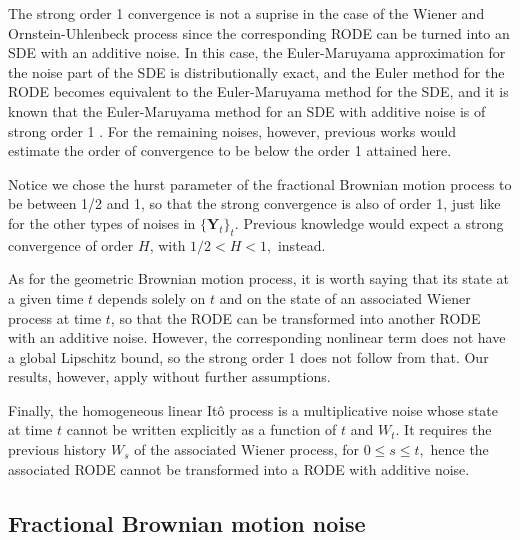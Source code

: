 \documentclass[reqno,12pt]{amsart}
\theoremstyle{plain} %
\theoremstyle{definition} %
\begin{document}
The strong order 1 convergence is not a suprise in the case of the Wiener and Ornstein-Uhlenbeck process since the corresponding RODE can be turned into an SDE with an additive noise. In this case, the Euler-Maruyama approximation for the noise part of the SDE is distributionally exact, and the Euler method for the RODE becomes equivalent to the Euler-Maruyama method for the SDE, and it is known that the Euler-Maruyama method for an SDE with additive noise is of strong order 1 \cite{HighamKloeden2021}. For the remaining noises, however, previous works would estimate the order of convergence to be below the order 1 attained here.

Notice we chose the hurst parameter of the fractional Brownian motion process to be between 1/2 and 1, so that the strong convergence is also of order 1, just like for the other types of noises in $\{\mathbf{Y}_t\}_t$. Previous knowledge would expect a strong convergence of order $H$, with $1/2 < H < 1,$ instead.

As for the geometric Brownian motion process, it is worth saying that its state at a given time $t$ depends solely on $t$ and on the state of an associated Wiener process at time $t$, so that the RODE can be transformed into another RODE with an additive noise. However, the corresponding nonlinear term does not have a global Lipschitz bound, so the strong order 1 does not follow from that. Our results, however, apply without further assumptions.

Finally, the homogeneous linear It\^o process is a multiplicative noise whose state at time $t$ cannot be written explicitly as a function of $t$ and $W_t.$ It requires the previous history $W_s$ of the associated Wiener process, for $0\leq s \leq t,$ hence the associated RODE cannot be transformed into a RODE with additive noise.

\subsection{Fractional Brownian motion noise}
\label{secfBmnoise}
\end{document}
